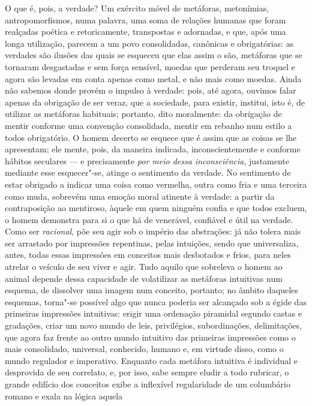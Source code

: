 O que é, pois, a verdade? Um exército móvel de metáforas, metonímias,
antropomorfismos, numa palavra, uma soma de relações humanas que foram
realçadas poética e retoricamente, transpostas e adornadas, e que, após
uma longa utilização, parecem a um povo consolidadas, canônicas e
obrigatórias: as verdades são ilusões das quais se esqueceu que elas
assim o são, metáforas que se tornaram desgastadas e sem força
sensível, moedas que perderam seu troquel e agora são levadas em conta
apenas como metal, e não mais como moedas. Ainda não sabemos donde provém o
impulso à verdade: pois, até agora, ouvimos falar apenas da obrigação
de ser veraz, que a sociedade, para existir, institui, isto é, de
utilizar as metáforas habituais; portanto, dito moralmente: da
obrigação de mentir conforme uma convenção consolidada, mentir em
rebanho num estilo a todos obrigatório. O homem decerto se esquece que
é assim que as coisas se lhe apresentam; ele mente, pois, da maneira
indicada, inconscientemente e conforme hábitos seculares --- e
precisamente \textit{por meio dessa inconsciência}, justamente mediante
esse esquecer"-se, atinge o sentimento da verdade. No sentimento de
estar obrigado a indicar uma coisa como vermelha, outra como fria e
uma terceira como muda, sobrevém uma emoção moral 
atinente à verdade: a
partir da contraposição ao mentiroso, àquele em quem ninguém confia e
que todos excluem, o homem demonstra para si o que há de venerável,
confiável e útil na verdade. Como ser \textit{racional}, põe seu 
agir sob o império das abstrações: já não tolera mais ser arrastado
por impressões repentinas, pelas intuições, sendo que universaliza,
antes, todas essas impressões em conceitos mais desbotados e frios,
para neles atrelar o veículo de seu viver e agir. Tudo aquilo que
sobreleva o homem ao animal depende dessa capacidade de volatilizar as
metáforas intuitivas num esquema, de dissolver uma imagem num conceito,
portanto; no âmbito daqueles esquemas, torna"-se possível algo que
nunca poderia ser alcançado sob a égide das primeiras impressões
intuitivas: erigir uma ordenação piramidal segundo castas e gradações,
criar um novo mundo de leis, privilégios, subordinações, delimitações,
que agora faz frente ao outro mundo intuitivo das primeiras impressões
como o mais consolidado, universal, conhecido, humano e, em virtude
disso, como o mundo regulador e imperativo. Enquanto cada metáfora
intuitiva é individual e desprovida de seu correlato, e, por isso, sabe
sempre eludir a todo rubricar, o grande edifício dos conceitos exibe a
inflexível regularidade de um columbário romano e 
exala na lógica aquela
